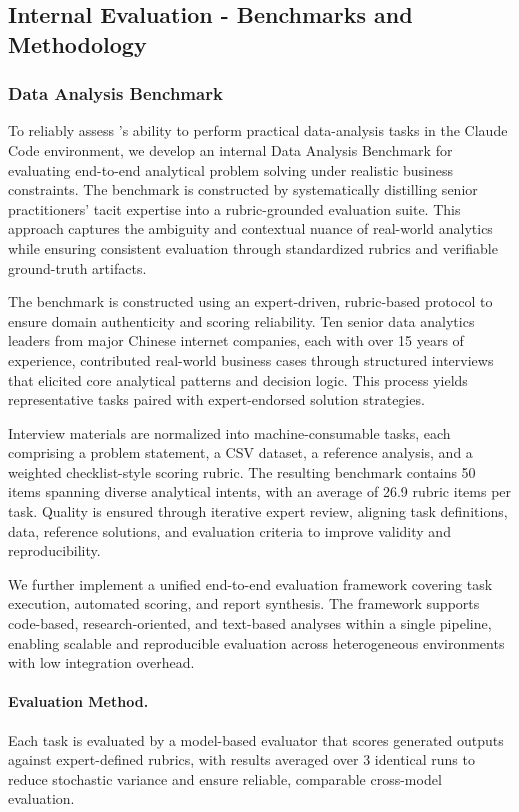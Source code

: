 \subsection{Internal Evaluation - Benchmarks and Methodology}
\subsubsection{Data Analysis Benchmark}
To reliably assess \ourmodel’s ability to perform practical data-analysis tasks in the Claude Code environment, we develop an internal Data Analysis Benchmark for evaluating end-to-end analytical problem solving under realistic business constraints. The benchmark is constructed by systematically distilling senior practitioners’ tacit expertise into a rubric-grounded evaluation suite. This approach captures the ambiguity and contextual nuance of real-world analytics while ensuring consistent evaluation through standardized rubrics and verifiable ground-truth artifacts.

The benchmark is constructed using an expert-driven, rubric-based protocol to ensure domain authenticity and scoring reliability. Ten senior data analytics leaders from major Chinese internet companies, each with over 15 years of experience, contributed real-world business cases through structured interviews that elicited core analytical patterns and decision logic. This process yields representative tasks paired with expert-endorsed solution strategies.

Interview materials are normalized into machine-consumable tasks, each comprising a problem statement, a CSV dataset, a reference analysis, and a weighted checklist-style scoring rubric. The resulting benchmark contains 50 items spanning diverse analytical intents, with an average of 26.9 rubric items per task. Quality is ensured through iterative expert review, aligning task definitions, data, reference solutions, and evaluation criteria to improve validity and reproducibility.

We further implement a unified end-to-end evaluation framework covering task execution, automated scoring, and report synthesis. The framework supports code-based, research-oriented, and text-based analyses within a single pipeline, enabling scalable and reproducible evaluation across heterogeneous environments with low integration overhead.

\paragraph{Evaluation Method.}
Each task is evaluated by a model-based evaluator that scores generated outputs against expert-defined rubrics, with results averaged over 3 identical runs to reduce stochastic variance and ensure reliable, comparable cross-model evaluation.

